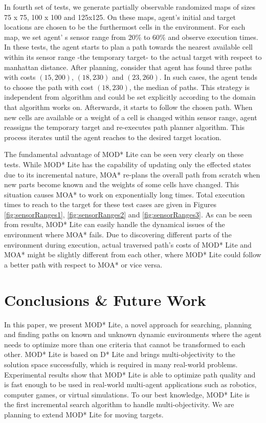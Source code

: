 \documentclass[10pt, a4paper, conference, compsocconf]{IEEEtran}
\begin{document}
In fourth set of tests, we generate partially observable randomized maps of sizes 75 x 75, 100 x 100 and 125x125. On these maps, agent's initial and target locations are chosen to be the furthermost cells in the environment. For each map, we set agent' s sensor range from 20\% to 60\% and observe execution times. In these tests, the agent starts to plan a path towards the nearest available cell within its sensor range -the temporary target- to the actual target with respect to manhattan distance. After planning, consider that agent has found three paths with costs $(15, 200)$, $(18, 230)$ and $(23, 260)$. In such cases, the agent tends to choose the path with cost $(18, 230)$, the median of paths. This strategy is independent from algorithm and could be set explicitly according to the domain that algorithm works on. Afterwards, it starts to follow the chosen path. When new cells are available or a weight of a cell is changed within sensor range, agent reassigns the temporary target and re-executes path planner algorithm. This process iterates until the agent reaches to the desired target location.

The fundamental advantage of MOD* Lite can be seen very clearly on these tests. While MOD* Lite has the capability of updating only the effected states due to its incremental nature, MOA* re-plans the overall path from scratch when new parts become known and the weights of some cells have changed. This situation causes MOA* to work on exponentially long times. Total execution times to reach to the target for these test cases are given in Figures \ref{fig:sensorRanges1}, \ref{fig:sensorRanges2} and \ref{fig:sensorRanges3}. As can be seen from results, MOD* Lite can easily handle the dynamical issues of the environment where MOA* fails. Due to discovering different parts of the environment during execution, actual traversed path's costs of MOD* Lite and MOA* might be slightly different from each other, where MOD* Lite could follow a better path with respect to MOA* or vice versa.


\section{Conclusions \& Future Work}
In this paper, we present MOD* Lite, a novel approach for searching, planning and finding paths on known and unknown dynamic environments where the agent needs to optimize more than one criteria that cannot be transformed to each other. MOD* Lite is based on D* Lite and brings multi-objectivity to the solution space successfully, which is required in many real-world problems. Experimental results show that MOD* Lite is able to optimize path quality and is fast enough to be used in real-world multi-agent applications such as robotics, computer games, or virtual simulations. To our best knowledge, MOD* Lite is the first incremental search algorithm to handle multi-objectivity. We are planning to extend MOD* Lite for moving targets. 



\end{document}
